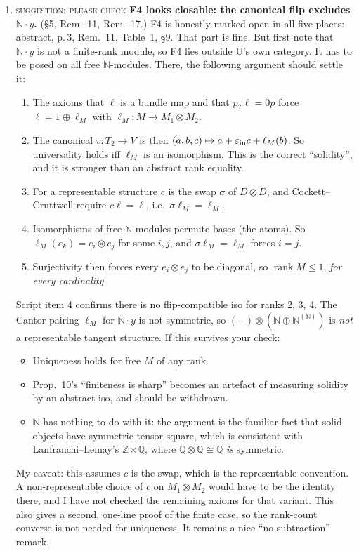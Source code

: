 \documentclass[11pt]{article}
\newcommand{\N}{\mathbb{N}}
\newcommand{\iss}[1]{\textsc{#1}}
\begin{document}
\begin{enumerate}[label=\textbf{U\arabic*.},leftmargin=*]
\item \iss{suggestion; please check} \textbf{F4 looks closable: the canonical flip excludes
$\N\cdot y$.} (\S5, Rem.~11, Rem.~17.) F4 is honestly marked open in all five places: abstract,
p.\,3, Rem.~11, Table~1, \S9. That part is fine. But first note that $\N\cdot y$ is not a
finite-rank module, so F4 lies outside U's own category. It has to be posed on all free
$\N$-modules. There, the following argument should settle it:
\begin{enumerate}[label=(\roman*),leftmargin=1.5em]
\item The axioms that $\ell$ is a bundle map and that $p_T\ell=0p$ force
$\ell=1\oplus\ell_M$ with $\ell_M\colon M\to M_1\otimes M_2$.
\item The canonical $v\colon T_2\to V$ is then
$(a,b,c)\mapsto a+\varepsilon_{\rm in}c+\ell_M(b)$. So universality holds iff $\ell_M$ is an
isomorphism. This is the correct ``solidity'', and it is stronger than an abstract rank equality.
\item For a representable structure $c$ is the swap $\sigma$ of $D\otimes D$, and
Cockett--Cruttwell require $c\ell=\ell$, i.e.\ $\sigma\ell_M=\ell_M$.
\item Isomorphisms of free $\N$-modules permute bases (the atoms). So $\ell_M(e_k)=e_i\otimes e_j$
for some $i,j$, and $\sigma\ell_M=\ell_M$ forces $i=j$.
\item Surjectivity then forces every $e_i\otimes e_j$ to be diagonal, so
$\operatorname{rank}M\le1$, \emph{for every cardinality}.
\end{enumerate}
Script item 4 confirms there is no flip-compatible iso for ranks 2, 3, 4. The Cantor-pairing
$\ell_M$ for $\N\cdot y$ is not symmetric, so $(-)\otimes(\N\oplus\N^{(\N)})$ is \emph{not} a
representable tangent structure. If this survives your check:
\begin{itemize}[leftmargin=1.2em]
\item Uniqueness holds for free $M$ of any rank.
\item Prop.~10's ``finiteness is sharp'' becomes an artefact of measuring solidity by an abstract
iso, and should be withdrawn.
\item $\N$ has nothing to do with it: the argument is the familiar fact that solid objects have
symmetric tensor square, which is consistent with Lanfranchi--Lemay's $\mathbb{Z}\ltimes\mathbb{Q}$,
where $\mathbb{Q}\otimes\mathbb{Q}\cong\mathbb{Q}$ \emph{is} symmetric.
\end{itemize}
My caveat: this assumes $c$ is the swap, which is the representable convention. A non-representable
choice of $c$ on $M_1\otimes M_2$ would have to be the identity there, and I have not checked the
remaining axioms for that variant. This also gives a second, one-line proof of the finite case, so
the rank-count converse is not needed for uniqueness. It remains a nice ``no-subtraction'' remark.
\end{enumerate}
\end{document}
